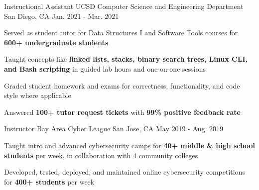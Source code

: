 \begin{cventries}
  \cventry
    {Instructional Assistant} %
    {UCSD Computer Science and Engineering Department} %
    {San Diego, CA} %
    {Jan. 2021 - Mar. 2021} %
    {
      \begin{cvitems} %
        \item {Served as student tutor for Data Structures I and Software Tools courses for \textbf{600+ undergraduate students}}
        \item {Taught concepts like \textbf{linked lists, stacks, binary search trees, Linux CLI, and Bash scripting} in guided lab hours and one-on-one sessions}
        \item {Graded student homework and exams for correctness, functionality, and code style where applicable}
        \item {Answered \textbf{100+ tutor request tickets} with \textbf{99\% positive feedback rate}}
      \end{cvitems}
    }


  \cventry
    {Instructor} %
    {Bay Area Cyber League} %
    {San Jose, CA} %
    {May 2019 - Aug. 2019} %
    {
      \begin{cvitems} %
        \item {Taught intro and advanced cybersecurity camps for \textbf{40+ middle \& high school students} per week, in collaboration with 4 community colleges}
        \item {Developed, tested, deployed, and maintained online cybersecurity competitions for \textbf{400+ students} per week}
      \end{cvitems}
    }


\end{cventries}
